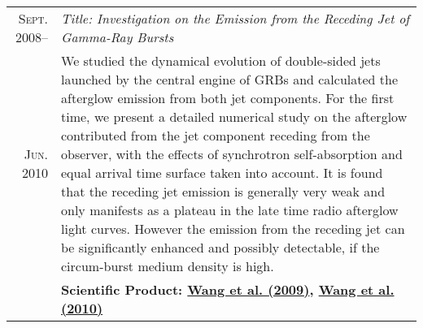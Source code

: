 \documentclass[letterpaper,10pt]{article}
\begin{document}
\begin{longtable}{r|p{5.5in}}
  \textsc{Sept. 2008}--  &   \emph{Title: Investigation on the Emission from the Receding Jet of Gamma-Ray Bursts}   \\
  \textsc{Jun. 2010}    &   \small{We studied the dynamical evolution of double-sided jets launched by 
  the central engine of GRBs and calculated the afterglow emission from both jet components. For the first time, we present a 
  detailed numerical study on the afterglow contributed from the jet component receding from the observer, with the effects of 
  synchrotron self-absorption and equal arrival time surface taken into account. It is found that the receding jet emission is 
  generally very weak and only manifests as a plateau in the late time radio afterglow light curves. However the emission from the 
  receding jet can be significantly enhanced and possibly detectable, if the circum-burst medium density is high.} \\
  &   \textbf{Scientific Product: \hyperlink{09.wang.aa}{Wang et al. (2009)}, \hyperlink{10.wang.scichina}{Wang et al. (2010)}} \\
\end{longtable}

\end{document}
